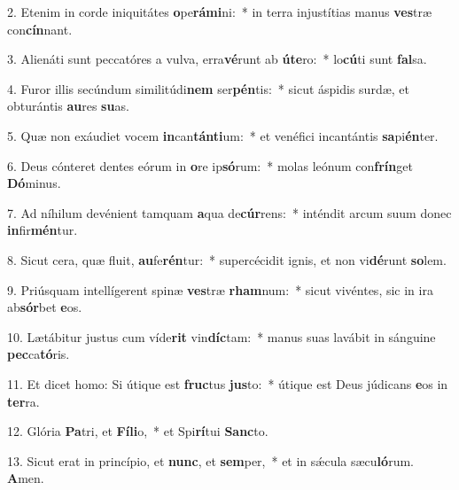 2. Etenim in corde iniquitátes \textbf{o}pe\textbf{rá}\textbf{mi}ni:~*  in terra injustítias manus \textbf{ves}træ con\textbf{cín}nant.\

3. Alienáti sunt peccatóres a vulva, erra\textbf{vé}runt ab \textbf{ú}\textbf{te}ro:~*  lo\textbf{cú}ti sunt \textbf{fal}sa.\

4. Furor illis secúndum similitúdi\textbf{nem} ser\textbf{pén}tis:~*  sicut áspidis surdæ, et obturántis \textbf{au}res \textbf{su}as.\

5. Quæ non exáudiet vocem \textbf{in}can\textbf{tán}\textbf{ti}um:~*  et venéfici incantántis \textbf{sa}pi\textbf{én}ter.\

6. Deus cónteret dentes eórum in \textbf{o}re ip\textbf{só}rum:~*  molas leónum con\textbf{frín}get \textbf{Dó}minus.\

7. Ad níhilum devénient tamquam \textbf{a}qua de\textbf{cúr}rens:~*  inténdit arcum suum donec \textbf{in}fir\textbf{mén}tur.\

8. Sicut cera, quæ fluit, \textbf{au}fe\textbf{rén}tur:~*  supercécidit ignis, et non vi\textbf{dé}runt \textbf{so}lem.\

9. Priúsquam intellígerent spinæ \textbf{ves}træ \textbf{rham}num:~*  sicut vivéntes, sic in ira ab\textbf{sór}bet \textbf{e}os.\

10. Lætábitur justus cum víde\textbf{rit} vin\textbf{díc}tam:~*  manus suas lavábit in sánguine \textbf{pec}ca\textbf{tó}ris.\

11. Et dicet homo: Si útique est \textbf{fruc}tus \textbf{jus}to:~*  útique est Deus júdicans \textbf{e}os in \textbf{ter}ra.\

12. Glória \textbf{Pa}tri, et \textbf{Fí}\textbf{li}o,~*  et Spi\textbf{rí}tui \textbf{Sanc}to.\

13. Sicut erat in princípio, et \textbf{nunc}, et \textbf{sem}per,~*  et in sǽcula sæcu\textbf{ló}rum. \textbf{A}men.\

